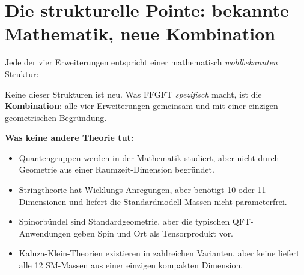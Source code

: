 \section{Die strukturelle Pointe: bekannte Mathematik, neue Kombination}

Jede der vier Erweiterungen entspricht einer mathematisch \emph{wohlbekannten} Struktur:

\begin{center}
\renewcommand{\arraystretch}{1.4}
{\small
{}
}
\renewcommand{\arraystretch}{1.0}
\end{center}

Keine dieser Strukturen ist neu. Was FFGFT \emph{spezifisch} macht,
ist die \textbf{Kombination}: alle vier Erweiterungen gemeinsam und
mit einer einzigen geometrischen Begründung.

\textbf{Was keine andere Theorie tut:}
\begin{itemize}[leftmargin=2em,itemsep=2pt,topsep=2pt]
  \item Quantengruppen werden in der Mathematik studiert, aber nicht
        durch Geometrie aus einer Raumzeit-Dimension begründet.
  \item Stringtheorie hat Wicklungs-Anregungen, aber benötigt 10 oder
        11 Dimensionen und liefert die Standardmodell-Massen nicht
        parameterfrei.
  \item Spinorbündel sind Standardgeometrie, aber die typischen QFT-
        Anwendungen geben Spin und Ort als Tensorprodukt vor.
  \item Kaluza-Klein-Theorien existieren in zahlreichen Varianten,
        aber keine liefert alle 12 SM-Massen aus einer einzigen
        kompakten Dimension.
\end{itemize}

